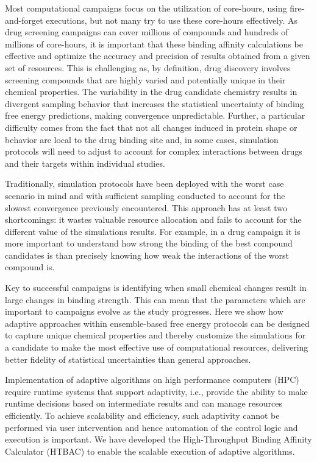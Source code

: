 Most computational campaigns focus on the utilization of core-hours, using
fire-and-forget executions, but not many try to use these core-hours
effectively. As drug screening campaigns can cover millions of compounds and
hundreds of millions of core-hours, it is important that these binding
affinity calculations be effective and optimize the accuracy and precision of
results obtained from a given set of resources. This is challenging as, by
definition, drug discovery involves screening compounds that are highly
varied and potentially unique in their chemical properties. The variability
in the drug candidate chemistry results in divergent sampling behavior that
increases the statistical uncertainty of binding free energy predictions,
making convergence unpredictable. Further, a particular difficulty comes from
the fact that not all changes induced in protein shape or behavior are local
to the drug binding site and, in some cases, simulation protocols will need
to adjust to account for complex interactions between drugs and their targets
within individual studies.

Traditionally, simulation protocols have been deployed with the worst case
scenario in mind and with sufficient sampling conducted to account for the
slowest convergence previously encountered. This approach has at least two
shortcomings: it wastes valuable resource allocation and fails to account
for the different value of the simulations results. For example, in a drug
campaign it is more important to understand how strong the binding of the
best compound candidates is than precisely knowing how weak the interactions
of the worst compound is.

Key to successful campaigns is identifying when small chemical changes result
in large changes in binding strength. This can mean that the parameters which
are important to campaigns evolve as the study progresses. Here we show how
adaptive approaches within ensemble-based free energy protocols can be
designed to capture unique chemical properties and thereby customize the
simulations for a candidate to make the most effective use of computational
resources, delivering better fidelity of statistical uncertainties than
general approaches.

Implementation of adaptive algorithms on high performance computers (HPC)
require runtime systems that support adaptivity, i.e., provide the ability to
make runtime decisions based on intermediate results and can manage resources
efficiently. To achieve scalability and efficiency, such adaptivity cannot be
performed via user intervention and hence automation of the control logic and
execution is important. We have developed the High-Throughput Binding
Affinity Calculator (HTBAC) to enable the scalable execution of adaptive
algorithms.

